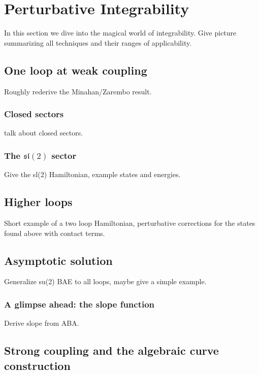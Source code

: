 
\section{Perturbative Integrability}

In this section we dive into the magical world of integrability.
Give picture summarizing all techniques and their ranges of applicability.

\subsection{One loop at weak coupling}

Roughly rederive the Minahan/Zarembo result.

\subsubsection{Closed sectors}

talk about closed sectors.

\subsubsection{The $\mathfrak{sl}(2)$ sector}

Give the sl(2) Hamiltonian, example states and energies.

\subsection{Higher loops}

Short example of a two loop Hamiltonian, perturbative corrections for the states found above with contact terms.

\subsection{Asymptotic solution}

Generalize su(2) BAE to all loops, maybe give a simple example. 

\subsubsection{A glimpse ahead: the slope function}

Derive slope from ABA.

\subsection{Strong coupling and the algebraic curve construction}

